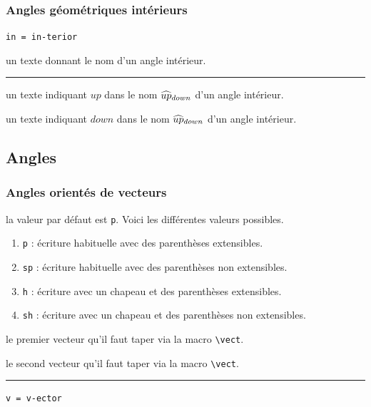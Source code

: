 \documentclass[12pt,a4paper]{book}
\newcommand\env[1]{\texttt{#1}}
\newcommand\macro[1]{\env{\textbackslash{}#1}}
\theoremstyle{definition}
\newcommand\separation{
	\medskip
	\hfill\rule{0.5\textwidth}{0.75pt}\hfill
	\medskip
}
\newcommand\mwhyprefix[2]{%
	\texttt{#1 = #1-#2}%
}
\begin{document}
{{\subsubsection{Angles géométriques \og intérieurs \fg}



  \hfill \mwhyprefix{in}{terior}

\IDarg{} un texte donnant le nom d'un angle intérieur.


\separation



 un texte indiquant $up$ dans le nom $\anglein*{up}{down}$ d'un angle intérieur.

 un texte indiquant $down$ dans le nom $\anglein*{up}{down}$ d'un angle intérieur.


\subsection{Angles}

\subsubsection{Angles orientés de vecteurs}




\IDoption{} la valeur par défaut est \verb+p+.  Voici les différentes valeurs possibles.
\begin{enumerate}
	\item \verb+p+ : écriture habituelle avec des parenthèses extensibles.

	\item \verb+sp+ : écriture habituelle avec des parenthèses non extensibles.

	\item \verb+h+ : écriture avec un chapeau et des parenthèses extensibles.

	\item \verb+sh+ : écriture avec un chapeau et des parenthèses non extensibles.
\end{enumerate}

 le premier vecteur qu'il faut taper via la macro \macro{vect}.

 le second vecteur qu'il faut taper via la macro \macro{vect}.


\separation


 \hfill \mwhyprefix{v}{ector}

}}
\end{document}
